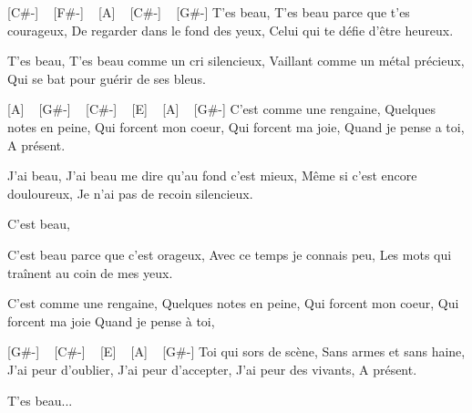[C#-] ~ [F#-] ~ [A] ~ [C#-] ~ [G#-]
T'es beau,
T'es beau parce que t'es courageux,
De regarder dans le fond des yeux,
Celui qui te défie d'être heureux.


T'es beau,
T'es beau comme un cri silencieux,
Vaillant comme un métal précieux,
Qui se bat pour guérir de ses bleus.

[A] ~ [G#-] ~ [C#-] ~ [E] ~ [A] ~ [G#-]
C'est comme une rengaine,
Quelques notes en peine,
Qui forcent mon coeur,
Qui forcent ma joie,
Quand je pense a toi,
A présent.

J'ai beau,
J'ai beau me dire qu'au fond c'est mieux,
Même si c'est encore douloureux,
Je n'ai pas de recoin silencieux.

C'est beau,

C'est beau parce que c'est orageux,
Avec ce temps je connais peu,
Les mots qui traînent au coin de mes yeux.

C'est comme une rengaine,
Quelques notes en peine,
Qui forcent mon coeur,
Qui forcent ma joie
Quand je pense à  toi,

[G#-] ~ [C#-] ~ [E] ~ [A] ~ [G#-]
Toi qui sors de scène,
Sans armes et sans haine,
J'ai peur d'oublier,
J'ai peur d'accepter,
J'ai peur des vivants,
A présent.

T'es beau... 